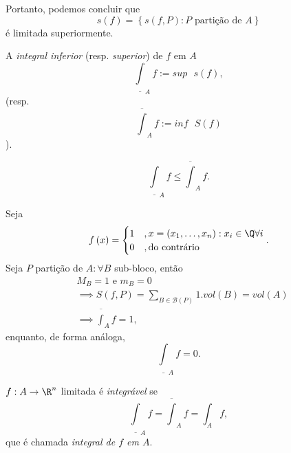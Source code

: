 Portanto, podemos concluir que \[
s\left( f \right) = \left\{ s\left( f,P \right) : P \text{ partição de }A \right\} 
\] é limitada superiormente.

\begin{definition}
    A \emph{integral inferior} (resp. \emph{superior}) de $f$ em $A$ \[
	\underline{\int}_A f := sup\text{ }s\left( f \right) 
,\] (resp. \[
	\overline{\int}_A f := inf\text{ }S\left( f \right) 
    \]).
\end{definition}

\begin{remark}
    \[
    \underline{\int}_A f \le  \overline{\int}_A f
    .\] 
\end{remark}

\begin{eg}
    Seja \[
    f\left( x \right) = \begin{cases}
	1 &, x=\left( x_1,\ldots,x_n \right) : x_i\in \Q \forall i \\
	0 &, \text{do contrário}
    \end{cases}
    .\]
    Seja $P$ partição de $A:\forall B $ sub-bloco, então
    \begin{align*}
	& M_B = 1 \text{ e }m_B=0 \\
	&\implies S\left( f, P \right) = \sum_{B\in \mathcal{B}\left( P \right) } 1 . vol\left( B \right)= vol \left( A \right) \\
	&\implies \overline{\int}_A f = 1
    ,\end{align*}
    enquanto, de forma análoga, \[
    \underline{\int}_A f = 0
    .\] 
\end{eg}

\begin{definition}
    $f:A\to \R^{n}$ limitada é \emph{integrável} se \[
	\underline{\int}_A f = \overline{\int}_A f = \int_A f
    ,\] que é chamada \emph{integral de $f$ em $A$}.
\end{definition}

